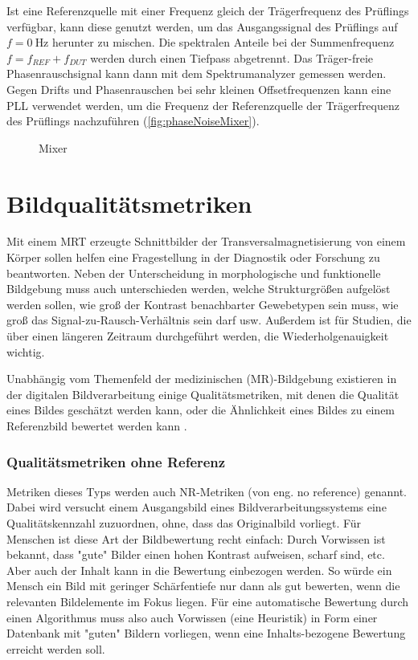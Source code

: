 Ist eine Referenzquelle mit einer Frequenz gleich der Trägerfrequenz des Prüflings verfügbar, kann diese genutzt werden, um das Ausgangssignal des Prüflings auf $f=\SI{0}{\hertz}$ herunter zu mischen. Die spektralen Anteile bei der Summenfrequenz $f=f_{REF}+f_{DUT}$ werden durch einen Tiefpass abgetrennt. Das Träger-freie Phasenrauschsignal kann dann mit dem Spektrumanalyzer gemessen werden.
Gegen Drifts und Phasenrauschen bei sehr kleinen Offsetfrequenzen kann eine PLL verwendet werden, um die Frequenz der Referenzquelle der Trägerfrequenz des Prüflings nachzuführen (\autoref{fig:phaseNoiseMixer}).

\begin{figure}[H]
	\centering
	\caption[ph]{Mixer}
	\label{fig:phaseNoiseMixer}
\end{figure}



\section{Bildqualitätsmetriken}
Mit einem MRT erzeugte Schnittbilder der Transversalmagnetisierung von einem Körper sollen helfen eine Fragestellung in der Diagnostik oder Forschung zu beantworten. Neben der Unterscheidung in morphologische und funktionelle Bildgebung muss auch unterschieden werden, welche Strukturgrößen aufgelöst werden sollen, wie groß der Kontrast benachbarter Gewebetypen sein muss, wie groß das Signal-zu-Rausch-Verhältnis sein darf usw. Außerdem ist für Studien, die über einen längeren Zeitraum durchgeführt werden, die Wiederholgenauigkeit wichtig.

Unabhängig vom Themenfeld der medizinischen (MR)-Bildgebung existieren in der digitalen Bildverarbeitung einige Qualitätsmetriken, mit denen die Qualität eines Bildes geschätzt werden kann, oder die Ähnlichkeit eines Bildes zu einem Referenzbild bewertet werden kann \cite{Wang2006}.

\subsubsection{Qualitätsmetriken ohne Referenz}
Metriken dieses Typs werden auch NR-Metriken (von eng. no reference) genannt. Dabei wird versucht einem Ausgangsbild eines Bildverarbeitungssystems eine Qualitätskennzahl zuzuordnen, ohne, dass das Originalbild vorliegt. Für Menschen ist diese Art der Bildbewertung recht einfach: Durch Vorwissen ist bekannt, dass "gute" Bilder einen hohen Kontrast aufweisen, scharf sind, etc. Aber auch der Inhalt kann in die Bewertung einbezogen werden. So würde ein Mensch ein Bild mit geringer Schärfentiefe nur dann als gut bewerten, wenn die relevanten Bildelemente im Fokus liegen. Für eine automatische Bewertung durch einen Algorithmus muss also auch Vorwissen (eine Heuristik) in Form einer Datenbank mit "guten" Bildern vorliegen, wenn eine Inhalts-bezogene Bewertung erreicht werden soll.

